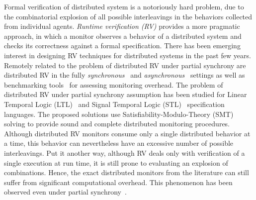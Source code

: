 Formal verification of distributed system is a notoriously hard problem, due to the combinatorial 
explosion of all possible interleavings in the behaviors collected from individual agents.
%
 \emph{Runtime verification (RV)} provides a more pragmatic approach, in which a monitor observes 
 a behavior of a distributed system and checks its correctness against a formal specification.
There has been emerging interest in designing RV techniques for distributed systems in the past few 
years.
%
Remotely related to the problem of distributed RV under partial synchrony are distributed RV in the 
fully {\em synchronous}~\cite{ef20,cf16,bf16} and {\em 
asynchronous}~\cite{cgnm13,mg05,og07,mb15,g20,bfrrt22} settings as well as  benchmarking 
tools~\cite{aafi21} for assessing monitoring overhead.
%
The problem of distributed RV under partial synchrony assumption has been studied for Linear 
 Temporal Logic (LTL)~\cite{GangulyMB20} and Signal Temporal Logic (STL)~\cite{MomtazAB23} 
 specification languages.
 The proposed solutions use Satisfiability-Modulo-Theory (SMT) solving to provide sound and 
 complete distributed monitoring procedures.
 Although distributed RV monitors consume only a single distributed behavior at a time, this behavior 
 can nevertheless have an excessive number of possible interleavings. 
 Put it another way, although RV deals only with verification of a single execution at run time, it is 
 still prone to evaluating an explosion of combinations.
 Hence, the exact distributed monitors from the literature can still suffer from significant 
 computational overhead.
 This phenomenon has been observed even under partial synchrony~\cite{GangulyMB20,gmb24}.
  

